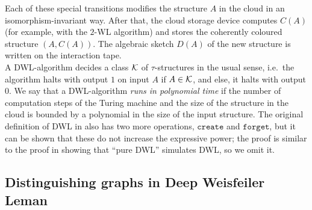 \documentclass[a4paper,UKenglish,cleveref, autoref, thm-restate]{lipics-v2021}
\newcommand{\Kk}{{\cal K}}
\newcommand{\createOp }{\texttt{create}}
\newcommand{\forgetOp }{\texttt{forget}}
\begin{document}
	Each of these special transitions modifies the structure $A$ in the cloud in an isomorphism-invariant way. After that, the cloud storage device computes $C(A)$ (for example, with the $2$-WL algorithm) and stores the coherently coloured structure $(A,C(A))$. The algebraic sketch $D(A)$ of the new structure is written on the interaction tape.\\
	A DWL-algorithm decides a class $\Kk$ of $\tau$-structures in the usual sense, i.e.\ the algorithm halts with output $1$ on input $A$ if $A \in \Kk$, and else, it halts with output $0$. We say that a DWL-algorithm \emph{runs in polynomial time} if the number of computation steps of the Turing machine and the size of the structure in the cloud is bounded by a polynomial in the size of the input structure.
	The original definition of DWL in \cite{dwl} also has two more operations, $\createOp$ and $\forgetOp$, but it can be shown that these do not increase the expressive power; the proof is similar to the proof in \cite{dwl} showing that ``pure DWL'' simulates DWL, so we omit it.
	
	
	
	
	\subsection{Distinguishing graphs in Deep Weisfeiler Leman}
	\label{sec:PC_distinguishingGraphsDWL}
	
\end{document}
